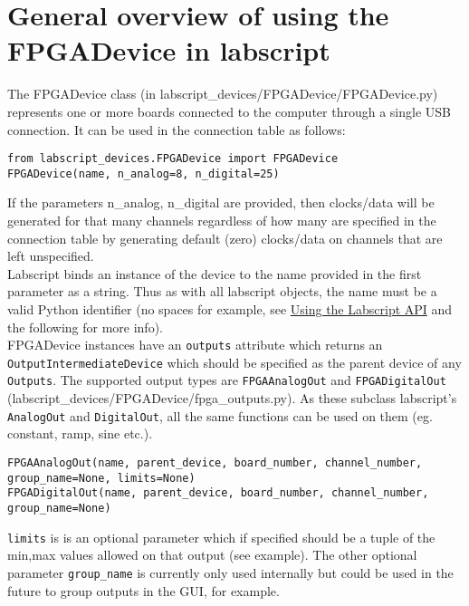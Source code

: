 \documentclass[11pt,a4paper]{article}
\begin{document}
\section{General overview of using the FPGADevice in labscript}
The FPGADevice class (in labscript\_devices/FPGADevice/FPGADevice.py) represents one or more boards connected to the computer through a single USB connection. It can be used in the connection table as follows:

\begin{verbatim}
from labscript_devices.FPGADevice import FPGADevice
FPGADevice(name, n_analog=8, n_digital=25)
\end{verbatim}

If the parameters n\_analog, n\_digital are provided, then clocks/data will be generated for that many channels regardless of how many are specified in the connection table by generating default (zero) clocks/data on channels that are left unspecified. \\

Labscript binds an instance of the device to the name provided in the first parameter as a string. Thus as with all labscript objects, the name must be a valid Python identifier (no spaces for example, see \href{http://labscriptsuite.org/docs/using_labscript.pdf}{Using the Labscript API} and the following for more info). \\

FPGADevice instances have an \texttt{outputs} attribute which returns an \texttt{OutputIntermediateDevice} which should be specified as the parent device of any \texttt{Outputs}. The supported output types are \texttt{FPGAAnalogOut} and \texttt{FPGADigitalOut} (labscript\_devices/FPGADevice/fpga\_outputs.py). As these subclass labscript's \texttt{AnalogOut} and \texttt{DigitalOut}, all the same functions can be used on them (eg. constant, ramp, sine etc.).

\begin{verbatim}
FPGAAnalogOut(name, parent_device, board_number, channel_number, group_name=None, limits=None)
FPGADigitalOut(name, parent_device, board_number, channel_number, group_name=None)
\end{verbatim}

\texttt{limits} is is an optional parameter which if specified should be a tuple of the min,max values allowed on that output (see example). The other optional parameter \texttt{group\_name} is currently only used internally but could be used in the future to group outputs in the GUI, for example.
\end{document}
